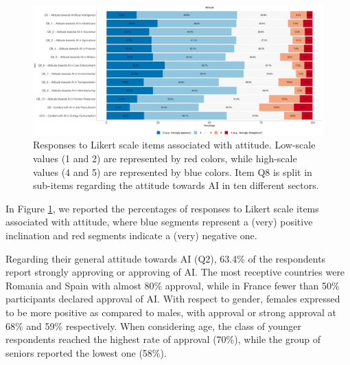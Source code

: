 \documentclass{article}
\begin{document}
\begin{figure}[!ht]
\centering

\includegraphics[width=\linewidth]{Fig2.eps}

\caption{Responses to Likert scale items associated with attitude. Low-scale values (1 and 2) are represented by red colors, while high-scale values (4 and 5) are represented by blue colors. Item Q8 is split in sub-items regarding the attitude towards AI in ten different sectors.
}
\label{Fig_2}
\end{figure}

In Figure \ref{Fig_2}, we reported the percentages of responses to Likert scale items associated with attitude, where blue segments represent a (very) positive inclination and red segments indicate a (very) negative one.  

Regarding their general attitude towards AI (Q2), 63.4\% of the respondents report strongly approving or approving of AI.
The most receptive countries were Romania and Spain with almost 80\% approval, while in France fewer than 50\% participants declared approval of AI. With respect to gender, females expressed to be more positive as compared to males, with approval or strong approval at 68\% and 59\% respectively. When considering age, the class of younger respondents reached the highest rate of approval (70\%), while the group of seniors reported the lowest one (58\%).
\end{document}
